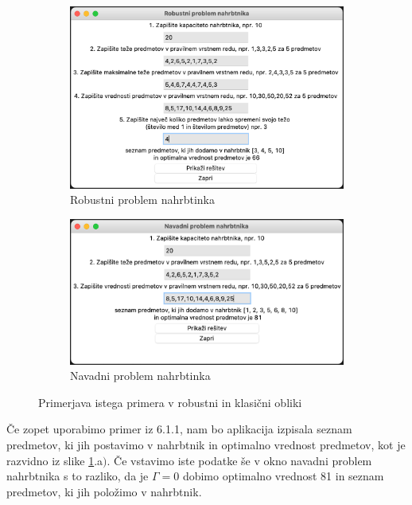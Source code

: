 \documentclass[a4paper,12pt]{article}
\theoremstyle{definition}
\begin{document}
\begin{figure}[h!]
    \centering
    \begin{subfigure}[b]{0.8\linewidth}
      \includegraphics[width=\linewidth]{graficni_prikaz_RKP.png}
      \caption{Robustni problem nahrbtinka}
      \smallskip
    \end{subfigure}
    \begin{subfigure}[b]{0.8\linewidth}
      \includegraphics[width=\linewidth]{graficni_prikaz_KP.png}
      \caption{Navadni problem nahrbtinka}
    \end{subfigure}
    \caption{Primerjava istega primera v robustni in klasični obliki}
    \label{fig:koda2}
  \end{figure}

\noindent Če zopet uporabimo primer iz 6.1.1, nam bo aplikacija izpisala seznam predmetov, ki jih 
postavimo v nahrbtnik in optimalno vrednost predmetov, kot je razvidno iz slike \ref{fig:koda2}.a$)$. Če vstavimo 
iste podatke še v okno navadni problem nahrbtnika s to razliko, da je $\Gamma = 0$ dobimo optimalno vrednost 81 in 
seznam predmetov, ki jih položimo v nahrbtnik.
\end{document}
